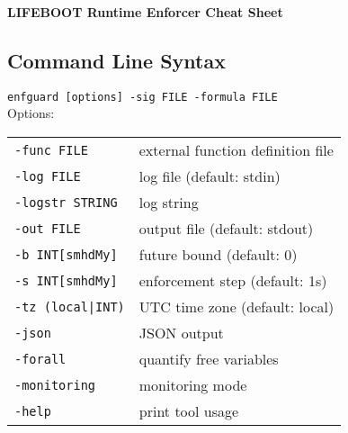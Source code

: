 \documentclass[a4paper,9pt]{extarticle}
\begin{document}
\begin{center}
    {\Large \textbf{LIFEBOOT Runtime Enforcer Cheat Sheet}}
\end{center}

\vspace{0.5em}

\begin{multicols}{2}

\section{Command Line Syntax}
\begin{tcolorbox}
  \texttt{enfguard [options] -sig FILE -formula FILE}
\\[10pt]
  Options:\\
  \begin{tabular}{ll}
    \texttt{-func FILE} & external function definition file \\
    \texttt{-log FILE} & log file (default: stdin) \\
    \texttt{-logstr STRING} & log string \\
    \texttt{-out FILE} & output file (default: stdout) \\
    \texttt{-b INT[smhdMy]} & future bound (default: 0) \\
    \texttt{-s INT[smhdMy]} & enforcement step (default: 1s) \\
    \texttt{-tz (local|INT)} & UTC time zone (default: local) \\
    \texttt{-json} & JSON output \\
    \texttt{-forall} & quantify free variables \\
    \texttt{-monitoring} & monitoring mode \\
    \texttt{-help} & print tool usage \\
  \end{tabular}
\end{tcolorbox}


\end{multicols}
\end{document}
